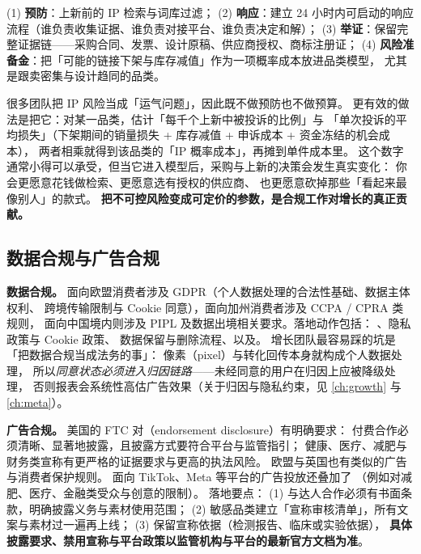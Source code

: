 (1) \textbf{预防}：上新前的 IP 检索与词库过滤；
(2) \textbf{响应}：建立 24 小时内可启动的响应流程（谁负责收集证据、谁负责对接平台、谁负责决定和解）；
(3) \textbf{举证}：保留完整证据链——采购合同、发票、设计原稿、供应商授权、商标注册证；
(4) \textbf{风险准备金}：把「可能的链接下架与库存减值」作为一项概率成本放进品类模型，
尤其是跟卖密集与设计趋同的品类。

\begin{insight}
很多团队把 IP 风险当成「运气问题」，因此既不做预防也不做预算。
更有效的做法是把它：对某一品类，估计「每千个上新中被投诉的比例」与
「单次投诉的平均损失」（下架期间的销量损失 + 库存减值 + 申诉成本 + 资金冻结的机会成本），
两者相乘就得到该品类的「IP 概率成本」，再摊到单件成本里。
这个数字通常小得可以承受，但当它进入模型后，采购与上新的决策会发生真实变化：
你会更愿意花钱做检索、更愿意选有授权的供应商、
也更愿意砍掉那些「看起来最像别人」的款式。
\textbf{把不可控风险变成可定价的参数，是合规工作对增长的真正贡献。}
\end{insight}

\subsection{数据合规与广告合规}

\textbf{数据合规。} 面向欧盟消费者涉及 GDPR（个人数据处理的合法性基础、数据主体权利、
跨境传输限制与 Cookie 同意），面向加州消费者涉及 CCPA / CPRA 类规则，
面向中国境内则涉及 PIPL 及数据出境相关要求。落地动作包括：
、隐私政策与 Cookie 政策、
数据保留与删除流程、以及。
增长团队最容易踩的坑是「把数据合规当成法务的事」：
像素（pixel）与转化回传本身就构成个人数据处理，
所以\emph{同意状态必须进入归因链路}——未经同意的用户在归因上应被降级处理，
否则报表会系统性高估广告效果（关于归因与隐私约束，见 \cref{ch:growth} 与 \cref{ch:meta}）。

\textbf{广告合规。} 美国的 FTC 对（endorsement disclosure）有明确要求：
付费合作必须清晰、显著地披露，且披露方式要符合平台与监管指引；
健康、医疗、减肥与财务类宣称有更严格的证据要求与更高的执法风险。
欧盟与英国也有类似的广告与消费者保护规则。
面向 TikTok、Meta 等平台的广告投放还叠加了
（例如对减肥、医疗、金融类受众与创意的限制）。
落地要点：
(1) 与达人合作必须有书面条款，明确披露义务与素材使用范围；
(2) 敏感品类建立「宣称审核清单」，所有文案与素材过一遍再上线；
(3) 保留宣称依据（检测报告、临床或实验依据），
\textbf{具体披露要求、禁用宣称与平台政策以监管机构与平台的最新官方文档为准}。


